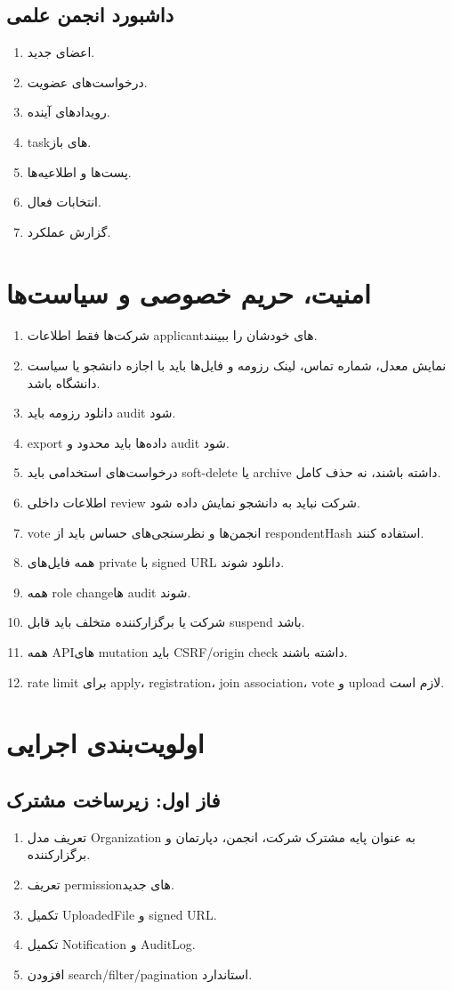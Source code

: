 \documentclass[12pt,a4paper]{article}
\begin{document}
\subsection{داشبورد انجمن علمی}
\begin{enumerate}
\item اعضای جدید.
\item درخواست‌های عضویت.
\item رویدادهای آینده.
\item taskهای باز.
\item پست‌ها و اطلاعیه‌ها.
\item انتخابات فعال.
\item گزارش عملکرد.
\end{enumerate}

\section{امنیت، حریم خصوصی و سیاست‌ها}
\begin{enumerate}
\item شرکت‌ها فقط اطلاعات applicantهای خودشان را ببینند.
\item نمایش معدل، شماره تماس، لینک رزومه و فایل‌ها باید با اجازه دانشجو یا سیاست دانشگاه باشد.
\item دانلود رزومه باید audit شود.
\item export داده‌ها باید محدود و audit شود.
\item درخواست‌های استخدامی باید soft-delete یا archive داشته باشند، نه حذف کامل.
\item اطلاعات داخلی review شرکت نباید به دانشجو نمایش داده شود.
\item vote انجمن‌ها و نظرسنجی‌های حساس باید از respondentHash استفاده کنند.
\item همه فایل‌های private با signed URL دانلود شوند.
\item همه role changeها audit شوند.
\item شرکت یا برگزارکننده متخلف باید قابل suspend باشد.
\item همه APIهای mutation باید CSRF/origin check داشته باشند.
\item rate limit برای apply، registration، join association، vote و upload لازم است.
\end{enumerate}

\section{اولویت‌بندی اجرایی}
\subsection{فاز اول: زیرساخت مشترک}
\begin{enumerate}
\item تعریف مدل Organization به عنوان پایه مشترک شرکت، انجمن، دپارتمان و برگزارکننده.
\item تعریف permissionهای جدید.
\item تکمیل UploadedFile و signed URL.
\item تکمیل Notification و AuditLog.
\item افزودن search/filter/pagination استاندارد.
\end{enumerate}
\end{document}
